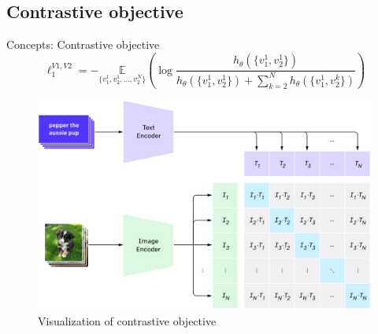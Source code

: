 \documentclass[xcolor=dvipsnames]{beamer}
\begin{document}
\subsection{Contrastive objective}
\begin{frame}{Concepts: Contrastive objective}
  \begin{equation}
    \ell_1^{V1, V2} = - \underset{\{v_1^1, v_2^1, \ldots, v_2^N\}}{\mathbb{E}} \left( \log \frac{h_\theta(\{v_1^1,v_2^1\})}{h_\theta(\{v_1^1,v_2^1\}) + \sum_{k=2}^N h_\theta(\{v_1^1, v_2^k\})} \right)
  \end{equation}

  \vspace{1cm}

  \begin{figure}[ht]
    \begin{minipage}{0.67\textwidth}
      \centering
      \includegraphics[width=0.9\linewidth]{../../figures/02-04-text-support-img/contrastive-pre-training}
    \end{minipage}
    \begin{minipage}[c]{0.3\textwidth}
      \caption{Visualization of contrastive objective \parencite{openai2021clipblog}}
    \end{minipage}
  \end{figure}
\end{frame}
\end{document}
